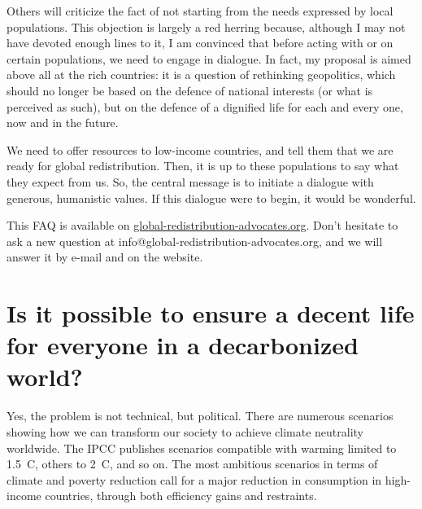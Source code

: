 \documentclass[a5paper,english,openany]{memoir}
\begin{document}
Others will criticize %
the fact of not starting from the needs expressed by local populations. 
This objection is largely a red herring because, although I may not have devoted enough lines to it, I am convinced that before acting with or on certain populations, we need to engage in dialogue. In fact, my proposal is aimed above all at the rich countries: it is a question of rethinking geopolitics, which should no longer be based on the defence %
of national interests (or what is perceived as such), but on the defence %
of a dignified life for each and every one, now and in the future. 

We need to offer resources to low-income countries, and tell them %
that we are ready for global redistribution. Then, it is up to these populations to say what they expect from us. 
So, the central message is to initiate a dialogue with generous, humanistic values. If this dialogue were to begin, it would be wonderful. 


This FAQ is available on \href{http://global-redistribution-advocates.org/}{global-redistribution-advocates.org}. Don't hesitate to ask a new question at info@global-redistribution-advocates.org, and we will answer it by e-mail and on the website.

\section*{\normalsize Is it possible to ensure a decent life for everyone in a decarbonized %
world?}\label{q:decent} %

Yes, the problem is not technical, but political. There are numerous scenarios showing how we can transform our society to achieve climate neutrality worldwide. The IPCC publishes scenarios compatible with warming limited to 1.5~\textdegree{}C, others to 2~\textdegree{}C, and so on. The most ambitious scenarios in terms of climate and poverty reduction call for a major reduction in consumption in high-income countries, through both efficiency gains and restraints. %
\end{document}
